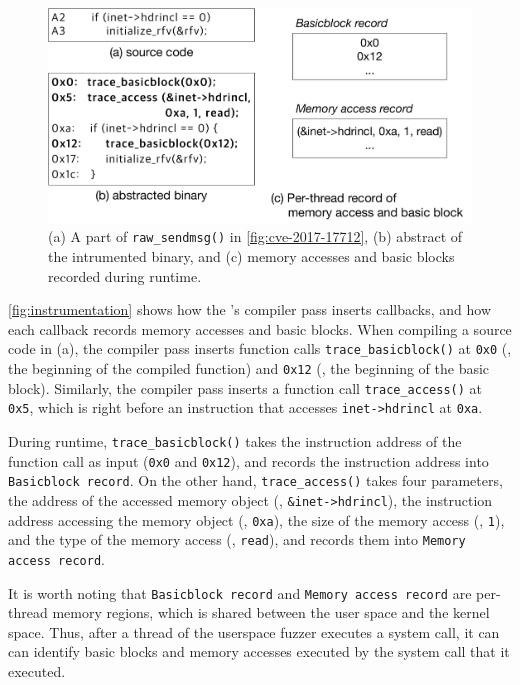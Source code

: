 \begin{figure}
  \centering
  \includegraphics[width=\linewidth]{fig/instrumentation.pdf}
  \caption{(a) A part of \texttt{raw_sendmsg()} in
    \autoref{fig:cve-2017-17712}, (b) abstract of the intrumented
    binary, and (c) memory accesses and basic blocks recorded during
    runtime.}
  \label{fig:instrumentation}
\end{figure}

\autoref{fig:instrumentation} shows how the \sys's compiler pass
inserts callbacks, and how each callback records memory accesses and
basic blocks.
%
When compiling a source code in (a), the compiler pass inserts
function calls \texttt{trace_basicblock()} at \texttt{0x0} (\ie, the
beginning of the compiled function) and \texttt{0x12} (\ie, the
beginning of the basic block).
%
Similarly, the compiler pass inserts a function call
\texttt{trace_access()} at \texttt{0x5}, which is right before an
instruction that accesses \texttt{inet->hdrincl} at \texttt{0xa}.


During runtime, \texttt{trace_basicblock()} takes the instruction
address of the function call as input (\ie \texttt{0x0} and
\texttt{0x12}), and records the instruction address into
\texttt{Basicblock record}.
%
On the other hand, \texttt{trace_access()} takes four parameters, the
address of the accessed memory object (\ie, \texttt{\&inet->hdrincl}),
the instruction address accessing the memory object (\ie,
\texttt{0xa}), the size of the memory access (\ie, \texttt{1}), and
the type of the memory access (\ie, \texttt{read}), and records them
into \texttt{Memory access record}.






It is worth noting that \texttt{Basicblock record} and \texttt{Memory
  access record} are per-thread memory regions, which is shared
between the user space and the kernel space. Thus, after a thread of
the userspace fuzzer executes a system call, it can can identify basic
blocks and memory accesses executed by the system call that it
executed.







